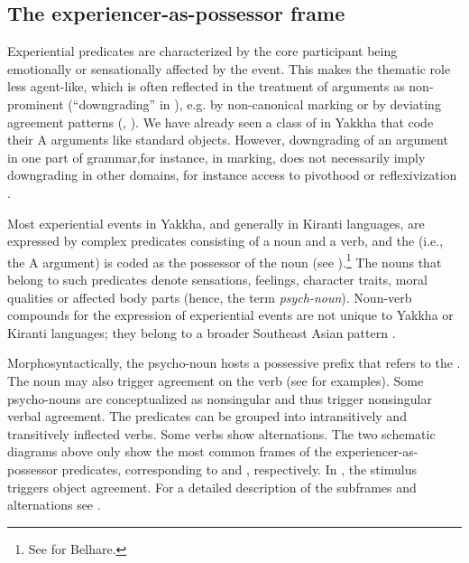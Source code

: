 \subsection{The experiencer-as-possessor frame}\label{exp}



\noindent
Experiential predicates are characterized by the core participant being emotionally or sensationally affected by the event. This makes the thematic role  less agent-like, which is often reflected in the treatment of  arguments as non-prominent (“downgrading” in \citealt{Bickel2004The-syntax}), e.g. by non-canonical  marking or by deviating agreement patterns (\citealt[22]{Levinetal2005_Argument}, \citealt[185]{Naess2007_Prototypical}). We have already seen a class of  in Yakkha that code their A arguments like standard objects. However, downgrading of an argument in one part of grammar,for instance, in  marking, does not necessarily imply downgrading in other domains, for instance access to pivothood or reflexivization \citep[77]{Bickel2004The-syntax}.

Most experiential events in Yakkha, and generally in Kiranti languages, are expressed by complex predicates consisting of a noun and a verb, and the 
 (i.e., the A argument) is coded as the possessor of the noun (see ).\footnote{See \citet{Bickel1997The-possessive} for Belhare.} 
The nouns that belong to such predicates denote sensations,  feelings,  character traits, moral qualities or affected body parts (hence, the term \emph{psych-noun}). 
Noun-verb compounds for the expression of experiential events are not unique to Yakkha or Kiranti languages; they belong to a broader Southeast Asian 
pattern \citep{Matisoff1986Hearts}. 

Morphosyntactically, the psycho-noun hosts a possessive prefix that refers to the . The noun may also trigger agreement on the verb (see \Next for examples). Some psycho-nouns are conceptualized as nonsingular and thus trigger nonsingular verbal agreement. The predicates can be grouped into intransitively and transitively inflected verbs. Some verbs show alternations. The two schematic diagrams above only show the most common frames  of the experiencer-as-possessor predicates, corresponding to \Next[a] and \Next[b], respectively. In \Next[c], the stimulus triggers object agreement. For a  detailed description of the subframes and alternations see .

